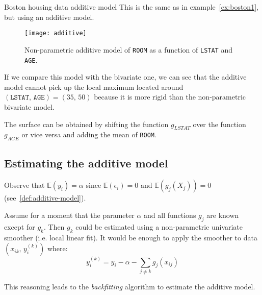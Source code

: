 \begin{example}{Boston housing data additive model}{}
    This is the same as in example~\ref{ex:boston1}, but using an additive model.
    \begin{figure}[H]
        \texttt{[image: additive]}
        \caption{Non-parametric additive model of \texttt{ROOM} as a function of \texttt{LSTAT} and \texttt{AGE}.}
    \end{figure}

    \tcblower

    If we compare this model with the bivariate one, we can see that the additive model
    cannot pick up the local maximum located around $(\texttt{LSTAT},\, \texttt{AGE}) = (35,\, 50)$ because
    it is more rigid than the non-parametric bivariate model.

    \begin{note}
        The surface can be obtained by shifting the function $g_{LSTAT}$ over the function
        $g_{AGE}$ or vice versa and adding the mean of \texttt{ROOM}.
    \end{note}
\end{example}

\pagebreak
\subsection{Estimating the additive model}
Observe that $\mathds{E}(y_i) = \alpha$ since $\mathds{E}(\epsilon_i) = 0$
and $\mathds{E}(g_j(X_{j})) = 0$ (see~\ref{def:additive-model}).

Assume for a moment that the parameter $\alpha$ and all functions
$g_j$ are known except for $g_k$. Then $g_k$ could be estimated using
a non-parametric univariate smoother (i.e. local linear fit).
It would be enough to apply the smoother to data $(x_{ik},\, y_i^{(k)})$
where:
\begin{equation*}
    y_i^{(k)} = y_i - \alpha - \sum_{j \neq k} g_j(x_{ij})
\end{equation*}

This reasoning leads to the \emph{backfitting} algorithm to estimate
the additive model.

